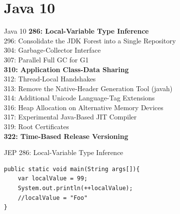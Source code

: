 \documentclass[aspectratio=169]{beamer}
\begin{document}
{
    \section{Java 10}
}


\begin{frame}[fragile]{Java 10}
\textbf{286: Local-Variable Type Inference}\\
296: Consolidate the JDK Forest into a Single Repository\\
304: Garbage-Collector Interface\\
307: Parallel Full GC for G1\\
\textbf{310: Application Class-Data Sharing}\\
312: Thread-Local Handshakes\\
313: Remove the Native-Header Generation Tool (javah)\\
314: Additional Unicode Language-Tag Extensions\\
316: Heap Allocation on Alternative Memory Devices\\
317: Experimental Java-Based JIT Compiler\\
319: Root Certificates\\
\textbf{322: Time-Based Release Versioning}\\
\end{frame}

\begin{frame}[fragile]{JEP 286: Local-Variable Type Inference}
\begin{lstlisting}
public static void main(String args[]){
    var localValue = 99;
    System.out.println(++localValue);
    //localValue = "Foo"
}
\end{lstlisting}	
\end{frame}
\end{document}
